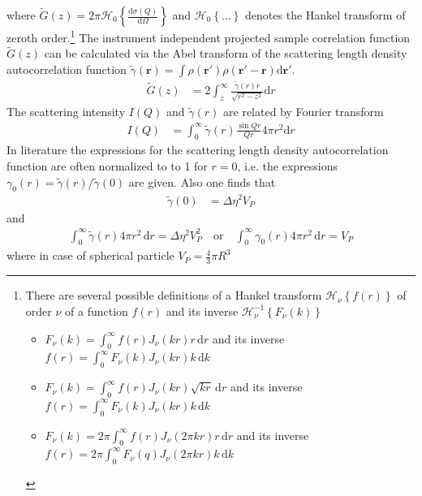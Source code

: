where $\tilde{G}(z)=2\pi\mathcal{H}_0\left\{\frac{\mathrm{d}\sigma(Q)}{\mathrm{d}\Omega}\right\}$ and $\mathcal{H}_0\left\{\ldots\right\}$ denotes the Hankel transform of zeroth order.\footnote{
There are several possible definitions of a Hankel transform $\mathcal{H}_\nu\left\{f(r)\right\}$ of order $\nu$ of a function $f(r)$ and its inverse $\mathcal{H}_\nu^{-1}\left\{F_\nu(k)\right\}$
\begin{itemize}
\item $F_\nu(k) = \int_0^\infty f(r) J_\nu(kr) r \,\mathrm{d}r$ and its inverse $f(r)=\int_0^\infty F_\nu(k)J_\nu(kr) k \,\mathrm{d}k$
\item $F_\nu(k) = \int_0^\infty f(r) J_\nu(kr) \sqrt{kr} \,\mathrm{d}r$ and its inverse $f(r)=\int_0^\infty F_\nu(k)J_\nu(kr) k \, \mathrm{d}k$
\item $F_\nu(k) = 2\pi \int_0^\infty f(r) J_\nu(2\pi kr) r \,\mathrm{d}r$ and its inverse $f(r)=2\pi \int_0^\infty F_\nu(q)J_\nu(2\pi kr) k \,\mathrm{d}k$
\end{itemize}
}
The instrument independent projected sample correlation function $\tilde{G}(z)$ can be calculated via the Abel transform of the scattering length density autocorrelation function $\tilde{\gamma}(\mathbf{r})=\int \rho(\mathbf{r'})\rho(\mathbf{r'-r})\mathrm{d}\mathbf{r'}$.
\begin{align}
\tilde{G}(z) &= 2 \int_z^\infty \frac{\tilde{\gamma}(r) r}{\sqrt{r^2-z^2}} \mathrm{d}r
\end{align}
The scattering intensity $I(Q)$ and  $\tilde{\gamma}(r)$ are related by Fourier transform
\begin{align}
I(Q) &= \int_0^\infty \tilde{\gamma}(r) \frac{\sin Qr}{Qr}4\pi r^2\mathrm{d}r
\end{align}
In literature the expressions for the scattering length density autocorrelation function are often normalized to to 1 for $r=0$, i.e. the expressions $\gamma_0(r)=\tilde{\gamma}(r)/\tilde{\gamma}(0)$ are given. Also one finds that
\begin{align}
\tilde{\gamma}(0)&=\Delta\eta^2 V_P
\end{align}
and
\begin{align}
\int_0^\infty \tilde{\gamma}(r) 4\pi r^2 \, \mathrm{d}r =\Delta\eta^2 V_P^2 \quad \mbox{or} \quad  \int_0^\infty \gamma_0(r) 4\pi r^2 \, \mathrm{d}r = V_P
\end{align}
where in case of spherical particle $V_P=\frac43 \pi R^3$

